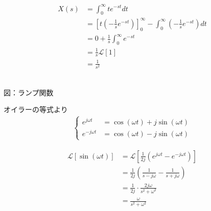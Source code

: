 \documentclass[a4paper,12pt]{article}
\begin{document}
\begin{tcolorbox}[title={[4] ランプ関数 \( x(t) = t \) をラプラス変換せよ．}]

\begin{minipage}{0.6\linewidth}
\begin{align*}
X(s) &= \int_0^{\infty} te^{-st} dt \\
&=\left[ t \left( - \frac{1}{s}e^{-st} \right) \right]_0^{\infty} - 
\int_0^{\infty} \left( -\frac{1}{s}e^{-st} \right) dt \\
&=0 + \frac{1}{s} \int_{0}^{\infty} e^{-st} \\
&=\frac{1}{s} \mathcal{L} \left[ 1 \right] \\
&=\frac{1}{s^2}
\end{align*}
\end{minipage}
\hfill
\begin{minipage}{0.35\linewidth}
\begin{center}
    \\
    図：ランプ関数
\end{center}
\end{minipage}

\end{tcolorbox}
\begin{tcolorbox}[title={[5] 正弦波関数 \( x(t) = \sin(\omega t) \) をラプラス変換せよ．}]

\quad オイラーの等式より
\begin{align*}
\left\{
    \begin{aligned}
        e^{j \omega t} &= \cos(\omega t) + j \sin(\omega t) \\
        e^{-j \omega t} &= \cos(\omega t) - j \sin(\omega t)
    \end{aligned}
\right.
\end{align*}

\vspace{-2mm}

\begin{align*}
\mathcal{L} \left[ \sin(\omega t) \right] &=
\mathcal{L} \left[ \frac{1}{2j}\left( e^{j \omega t} - e^{-j \omega t} \right) \right] \\
&=\frac{1}{2j} \left( \frac{1}{s-j \omega} - \frac{1}{s + j \omega} \right) \\
&=\frac{1}{2j} \cdot \frac{2j\omega}{s^2 + \omega^2} \\
&=\frac{\omega}{s^2 + \omega^2}
\end{align*}

\end{tcolorbox}
\end{document}
